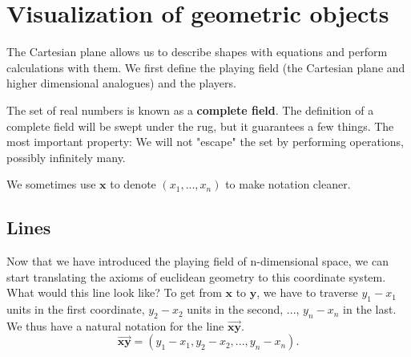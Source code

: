 \section{Visualization of geometric objects}
The Cartesian plane allows us to describe shapes with equations and perform calculations with them. We first define the playing field (the Cartesian plane and higher dimensional analogues) and the players.
\begin{remark}
	The set of real numbers is known as a \textbf{complete field}. The definition of a complete field will be swept under the rug, but it guarantees a few things. The most important property: We will not "escape" the set by performing operations, possibly infinitely many.
\end{remark}
\begin{remark}
	We sometimes use $\mathbf{x}$ to denote $(x_1,...,x_n)$ to make notation cleaner.
\end{remark}
\subsection{Lines}
Now that we have introduced the playing field of n-dimensional space, we can start translating the axioms of euclidean geometry to this coordinate system.
What would this line look like? To get from $\mathbf{x}$ to $\mathbf{y}$, we have to traverse $y_1-x_1$ units in the first coordinate, $y_2-x_2$ units in the second, ..., $y_n-x_n$ in the last. We thus have a natural notation for the line $\overrightarrow{\mathbf{xy}}$.
\[
 \overrightarrow{\mathbf{xy}}=(y_1-x_1,y_2-x_2,...,y_n-x_n).
\]


